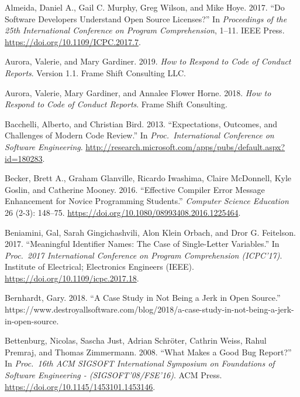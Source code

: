 \documentclass[
]{krantz}
\newlength{\cslhangindent}
\newenvironment{cslreferences}%
  {\setlength{\parindent}{0pt}%
  \everypar{\setlength{\hangindent}{\cslhangindent}}\ignorespaces}%
  {\par}
\begin{document}
\hypertarget{refs}{}
\begin{cslreferences}
\leavevmode\hypertarget{ref-Alme2017}{}%
Almeida, Daniel A., Gail C. Murphy, Greg Wilson, and Mike Hoye. 2017. ``Do Software Developers Understand Open Source Licenses?'' In \emph{Proceedings of the 25th International Conference on Program Comprehension}, 1--11. IEEE Press. \url{https://doi.org/10.1109/ICPC.2017.7}.

\leavevmode\hypertarget{ref-Auro2019}{}%
Aurora, Valerie, and Mary Gardiner. 2019. \emph{How to Respond to Code of Conduct Reports}. Version 1.1. Frame Shift Consulting LLC.

\leavevmode\hypertarget{ref-Auro2018}{}%
Aurora, Valerie, Mary Gardiner, and Annalee Flower Horne. 2018. \emph{How to Respond to Code of Conduct Reports}. Frame Shift Consulting.

\leavevmode\hypertarget{ref-Bacc2013}{}%
Bacchelli, Alberto, and Christian Bird. 2013. ``Expectations, Outcomes, and Challenges of Modern Code Review.'' In \emph{Proc.~International Conference on Software Engineering}. \url{http://research.microsoft.com/apps/pubs/default.aspx?id=180283}.

\leavevmode\hypertarget{ref-Beck2016}{}%
Becker, Brett A., Graham Glanville, Ricardo Iwashima, Claire McDonnell, Kyle Goslin, and Catherine Mooney. 2016. ``Effective Compiler Error Message Enhancement for Novice Programming Students.'' \emph{Computer Science Education} 26 (2-3): 148--75. \url{https://doi.org/10.1080/08993408.2016.1225464}.

\leavevmode\hypertarget{ref-Beni2017}{}%
Beniamini, Gal, Sarah Gingichashvili, Alon Klein Orbach, and Dror G. Feitelson. 2017. ``Meaningful Identifier Names: The Case of Single-Letter Variables.'' In \emph{Proc.~2017 International Conference on Program Comprehension (ICPC'17)}. Institute of Electrical; Electronics Engineers (IEEE). \url{https://doi.org/10.1109/icpc.2017.18}.

\leavevmode\hypertarget{ref-Bern2018}{}%
Bernhardt, Gary. 2018. ``A Case Study in Not Being a Jerk in Open Source.'' https://www.destroyallsoftware.com/blog/2018/a-case-study-in-not-being-a-jerk-in-open-source.

\leavevmode\hypertarget{ref-Bett2008}{}%
Bettenburg, Nicolas, Sascha Just, Adrian Schröter, Cathrin Weiss, Rahul Premraj, and Thomas Zimmermann. 2008. ``What Makes a Good Bug Report?'' In \emph{Proc.~16th ACM SIGSOFT International Symposium on Foundations of Software Engineering - (SIGSOFT'08/FSE'16)}. ACM Press. \url{https://doi.org/10.1145/1453101.1453146}.


\end{cslreferences}
\end{document}
